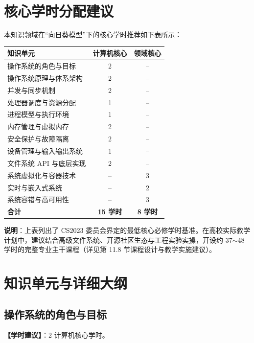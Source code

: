 \section{核心学时分配建议}

本知识领域在“向日葵模型”下的核心学时推荐如下表所示：

\begin{table}[H]
\centering
\setlength{\tabcolsep}{3.5pt}\fontsize{8pt}{9.6pt}\selectfont\begin{tabularx}{\columnwidth}{Y c c}
\toprule
\textbf{知识单元} & \textbf{计算机核心} & \textbf{领域核心} \\
\midrule
操作系统的角色与目标 & 2 & -- \\
操作系统原理与体系架构 & 2 & -- \\
并发与同步机制 & 2 & -- \\
处理器调度与资源分配 & 1 & -- \\
进程模型与执行环境 & 1 & -- \\
内存管理与虚拟内存 & 2 & -- \\
安全保护与故障隔离 & 2 & -- \\
设备管理与输入输出系统 & 1 & -- \\
文件系统 API 与底层实现 & 2 & -- \\
系统虚拟化与容器技术 & -- & 3 \\
实时与嵌入式系统 & -- & 2 \\
系统容错与高可用性 & -- & 3 \\
\midrule
\textbf{合计} & \textbf{15 学时} & \textbf{8 学时} \\
\bottomrule
\end{tabularx}
\end{table}

\noindent\textbf{说明}：上表列出了 CS2023 委员会界定的最低核心必修学时基准。在高校实际教学计划中，建议结合高级文件系统、开源社区生态与工程实验实操，开设约 37$\sim$48 学时的完整专业主干课程（详见第 11.8 节课程设计与教学实施建议）。

\section{知识单元与详细大纲}

\subsection{操作系统的角色与目标}
\textbf{【学时建议】}：2 计算机核心学时。

